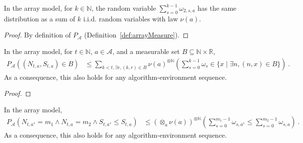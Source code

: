 \begin{lemma}\label{lem:AM.identDistrib_sum_range_snd}
  \leanok
In the array model, for $k \in \mathbb{N}$, the random variable $\sum_{s=0}^{k-1} \omega_{2, s, a}$ has the same distribution as a sum of $k$ i.i.d. random variables with law $\nu(a)$.
\end{lemma}

\begin{proof}\leanok
By definition of $P_{\mathcal{A}}$ (Definition~\ref{def:arrayMeasure}).
\end{proof}


\begin{lemma}\label{lem:prob_pullCount_prod_sumRewards_mem_le}
  \leanok
In the array model, for $t \in \mathbb{N}$, $a \in \mathcal{A}$, and a measurable set $B \subseteq \mathbb{N} \times \mathbb{R}$,
\begin{align*}
  P_{\mathcal{A}}\left((N_{t,a}, S_{t, a}) \in B\right)
  &\le \sum_{k < t, \exists r, (k, r) \in B} \nu(a)^{\otimes \mathbb{N}} \left(\sum_{s=0}^{k-1} \omega_{s} \in \{x \mid \exists n, (n, x) \in B\}\right)
  \: .
\end{align*}
As a consequence, this also holds for any algorithm-environment sequence.
\end{lemma}

\begin{proof}\leanok

\end{proof}


\begin{lemma}\label{lem:prob_sumRewards_le_sumRewards_le}
  \leanok
In the array model,
\begin{align*}
  P_{\mathcal{A}}\left( N_{t, a^*} = m_1 \wedge N_{t, a} = m_2 \wedge S_{t, a^*} \le S_{t, a}\right)
  &\le (\otimes_a \nu(a))^{\otimes \mathbb{N}} \left( \sum_{s=0}^{m_1-1} \omega_{s, a^*} \le \sum_{s=0}^{m_2-1} \omega_{s, a} \right)
  \: .
\end{align*}
As a consequence, this also holds for any algorithm-environment sequence.
\end{lemma}

